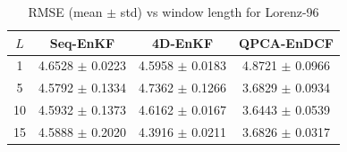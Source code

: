 \begin{table}[h]
\centering
\caption{RMSE (mean $\pm$ std) vs window length for Lorenz-96}
\label{tab:window_length_rmse}
\begin{tabular}{c|ccc}
\hline
$L$ & Seq-EnKF & 4D-EnKF & QPCA-EnDCF \\
\hline
1 & 4.6528 $\pm$ 0.0223 & 4.5958 $\pm$ 0.0183 & 4.8721 $\pm$ 0.0966 \\
5 & 4.5792 $\pm$ 0.1334 & 4.7362 $\pm$ 0.1266 & 3.6829 $\pm$ 0.0934 \\
10 & 4.5932 $\pm$ 0.1373 & 4.6162 $\pm$ 0.0167 & 3.6443 $\pm$ 0.0539 \\
15 & 4.5888 $\pm$ 0.2020 & 4.3916 $\pm$ 0.0211 & 3.6826 $\pm$ 0.0317 \\
\hline
\end{tabular}
\end{table}
